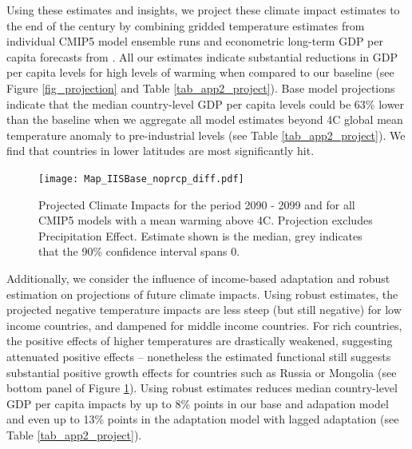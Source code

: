 \documentclass[11pt, letterpaper]{article}
\numberwithin{algorithm}{section}
\numberwithin{assumption}{section}
\numberwithin{lemma}{section}
\numberwithin{theorem}{section}
\numberwithin{corollary}{section}
\numberwithin{remark}{section}
\numberwithin{equation}{section}
\numberwithin{figure}{section}
\numberwithin{table}{section}
\begin{document}
Using these estimates and insights, we project these climate impact estimates to the end of the century by combining gridded temperature estimates from individual CMIP5 model ensemble runs and econometric long-term GDP per capita forecasts from \citet{muller2019econometric}. All our estimates indicate substantial reductions in GDP per capita levels for high levels of warming when compared to our baseline (see Figure \ref{fig_projection} and Table \ref{tab_app2_project}). Base model projections indicate that the median country-level GDP per capita levels could be 63\% lower than the baseline when we aggregate all model estimates beyond 4\textdegree C global mean temperature anomaly to pre-industrial levels (see Table \ref{tab_app2_project}). We find that countries in lower latitudes are most significantly hit.

\begin{figure}[!htbp]  %
\centering
\texttt{[image: Map\_IISBase\_noprcp\_diff.pdf]}
\caption{Projected Climate Impacts for the period 2090 - 2099 and for all CMIP5 models with a mean warming above 4\textdegree C. Projection excludes Precipitation Effect. Estimate shown is the median, grey indicates that the 90\% confidence interval spans 0.}
\label{fig_projection_map}
\end{figure}

Additionally, we consider the influence of income-based adaptation and robust estimation on projections of future climate impacts. Using robust estimates, the projected negative temperature impacts are less steep (but still negative) for low income countries, and dampened for middle income countries. For rich countries, the positive effects of higher temperatures are drastically weakened, suggesting attenuated positive effects -- nonetheless the estimated functional still suggests substantial positive growth effects for countries such as Russia or Mongolia (see bottom panel of Figure \ref{fig_projection_map}). Using robust estimates reduces median country-level GDP per capita impacts by up to 8\% points in our base and adapation model and even up to 13\% points in the adaptation model with lagged adaptation (see Table \ref{tab_app2_project}).
\end{document}
